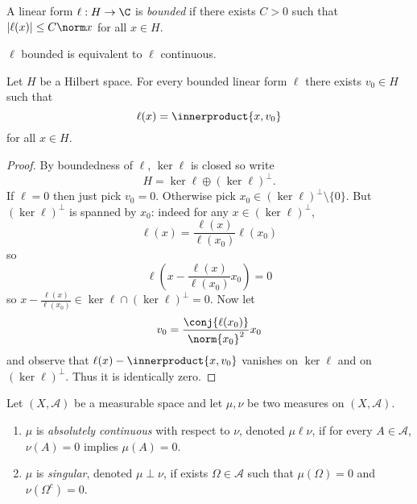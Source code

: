 \documentclass[a4paper]{article}
\newcommand*{\ip}{\innerproduct} %
\begin{document}
\begin{definition}
  A linear form \(\ell: H \to \C\) is \emph{bounded} if there exists \(C > 0\) such that \(|\ell(x)| \leq C\norm x\) for all \(x \in H\).
\end{definition}

\begin{remark}
  \(\ell\) bounded is equivalent to \(\ell\) continuous.
\end{remark}

\begin{theorem}
  Let \(H\) be a Hilbert space. For every bounded linear form \(\ell\) there exists \(v_0 \in H\) such that
  \[
    \ell(x) = \ip{x, v_0}
  \]
  for all \(x \in H\).
\end{theorem}

\begin{proof}
  By boundedness of \(\ell\), \(\ker \ell\) is closed so write
  \[
    H = \ker \ell \oplus (\ker \ell)^\perp.
  \]
  If \(\ell = 0\) then just pick \(v_0 = 0\). Otherwise pick \(x_0 \in (\ker \ell)^\perp \setminus \{0\}\). But \((\ker \ell)^\perp\) is spanned by \(x_0\): indeed for any \(x \in (\ker \ell)^\perp\),
  \[
    \ell(x) = \frac{\ell(x)}{\ell(x_0)} \ell(x_0)
  \]
  so
  \[
    \ell(x - \frac{\ell(x)}{\ell(x_0)} x_0) = 0
  \]
  so \(x - \frac{\ell(x)}{\ell(x_0)} \in \ker \ell \cap (\ker \ell)^\perp = 0\). Now let
  \[
    v_0 = \frac{\conj{\ell(x_0)}}{\norm{x_0}^2} x_0
  \]
  and observe that \(\ell(x) - \ip{x, v_0}\) vanishes on \(\ker \ell\) and on \((\ker \ell)^\perp\). Thus it is identically zero.
\end{proof}

\begin{definition}
  Let \((X, \mathcal A)\) be a measurable space and let \(\mu, \nu\) be two measures on \((X, \mathcal A)\).
  \begin{enumerate}
  \item \(\mu\) is \emph{absolutely continuous} with respect to \(\nu\), denoted \(\mu \ell \nu\), if for every \(A \in \mathcal A\), \(\nu(A) = 0\) implies \(\mu(A) = 0\).
  \item \(\mu\) is \emph{singular}, denoted \(\mu \perp \nu\), if exists \(\Omega \in \mathcal A\) such that \(\mu(\Omega) = 0\) and \(\nu(\Omega^c) = 0\).
  \end{enumerate}
\end{definition}
\end{document}
